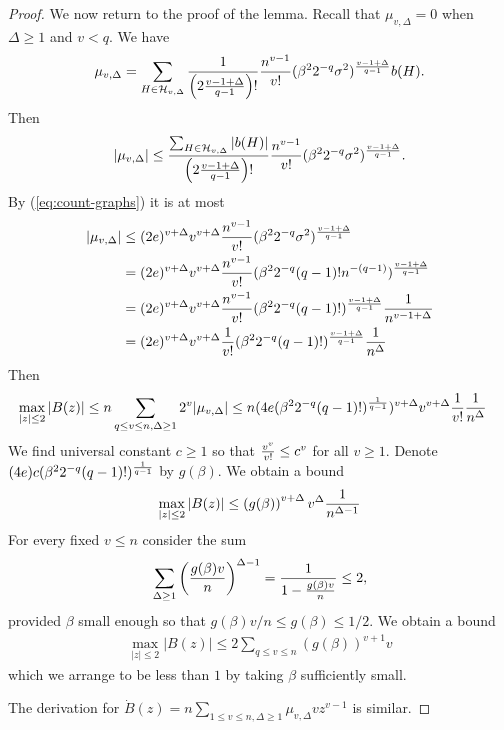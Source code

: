 \documentclass[12pt]{article}
\newcommand{\cH}{\mathcal{H}}
\begin{document}
\begin{proof}
We now return to the proof of the lemma. Recall that $\mu_{v,\Delta}=0$ when $\Delta\ge 1$ and $v<q$. We have
\begin{align*} 
\mu_{v,\Delta} =  
\sum_{H\in \cH_{v,\Delta}}{1\over  \left( 2{v-1+\Delta\over q-1} \right) !}{n^{v-1}\over v!}(\beta^2 2^{-q}\sigma^2)^{v-1+\Delta\over q-1}b(H).
\end{align*}
Then
\begin{align*} 
|\mu_{v,\Delta}| \le   {\sum_{H\in \cH_{v,\Delta}} |b(H)| \over   \left( 2{v-1+\Delta\over q-1} \right) !}
{n^{v-1}\over v!}(\beta^2 2^{-q}\sigma^2)^{v-1+\Delta\over q-1}.
\end{align*}
By (\ref{eq:count-graphs}) it is at most 
\begin{align*}
|\mu_{v,\Delta}|& \le (2e)^{v+\Delta} v^{v+\Delta}{n^{v-1}\over v!}(\beta^2 2^{-q}\sigma^2)^{v-1+\Delta\over q-1} \\
&=
(2e)^{v+\Delta} v^{v+\Delta}{n^{v-1}\over v!}(\beta^2 2^{-q}(q-1)!n^{-(q-1)})^{v-1+\Delta\over q-1} \\
&=
(2e)^{v+\Delta} v^{v+\Delta}{n^{v-1}\over v!}(\beta^2 2^{-q}(q-1)!)^{v-1+\Delta\over q-1}{1\over n^{v-1+\Delta}} \\
&=
(2e)^{v+\Delta} v^{v+\Delta}{1\over v!}(\beta^2 2^{-q}(q-1)!)^{v-1+\Delta\over q-1}{1\over n^{\Delta}} 
\end{align*}
Then
\begin{align*}
\max_{|z|\le 2}|B(z)|\le 
n\sum_{q\le v\le n,\Delta\ge 1}2^v |\mu_{v,\Delta}|  
&\le 
n(4e (\beta^2 2^{-q}(q-1)!)^{1\over q-1})^{v+\Delta}  v^{v+\Delta}{1\over v!}{1\over n^{\Delta}}
\end{align*}
We find universal constant $c\ge 1$ so that ${v^v\over v!}\le c^v$ for all $v\ge 1$. Denote $(4e)c (\beta^2 2^{-q}(q-1)!)^{1\over q-1}$ by $g(\beta)$.
We obtain a bound
\begin{align*}
\max_{|z|\le 2}|B(z)|\le  \left(g(\beta)\right)^{v+\Delta}v^{\Delta}{1\over n^{\Delta-1}}
\end{align*}
For every fixed $v\le n$ consider the sum 
\begin{align*}
\sum_{\Delta \ge 1} \left({g(\beta) v \over n}\right)^{\Delta-1}={1\over 1-{g(\beta) v\over n}} \le 2,
\end{align*}
provided $\beta$ small enough so that $g(\beta)v/n\le g(\beta)\le 1/2$.  
We obtain a bound
\begin{align*}
\max_{|z|\le 2}|B(z)| \le 2\sum_{q\le v\le n} \left(g(\beta)\right)^{v+1}v 
\end{align*}
which we arrange to be less than $1$ by taking $\beta$ sufficiently small.


The derivation for $\dot B(z)=n \sum_{1\le v\le n,\Delta\ge 1}\mu_{v,\Delta}vz^{v-1}$ is similar.
\end{proof}
\end{document}
